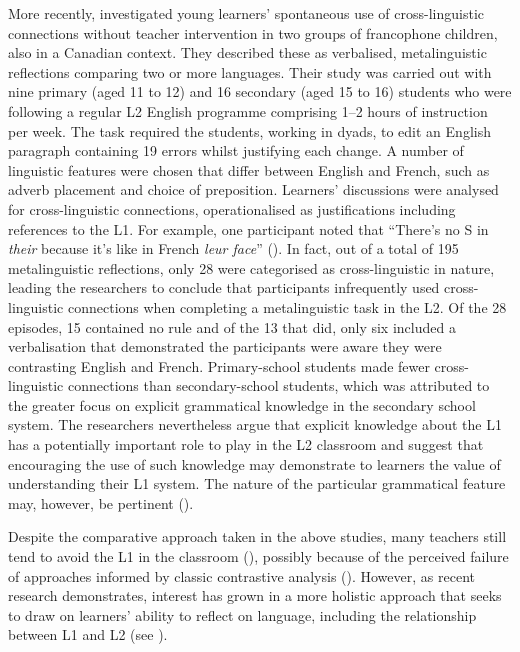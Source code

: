\documentclass[output=paper]{langscibook}
\begin{document}
More recently, \citet{BellEtAl2020} investigated young learners’ spontaneous use of cross-linguistic connections without teacher intervention in two groups of francophone children, also in a Canadian context. They described these as verbalised, metalinguistic reflections comparing two or more languages. Their study was carried out with nine primary (aged 11 to 12) and 16 secondary (aged 15 to 16) students who were following a regular L2 English programme comprising 1--2 hours of instruction per week. The task required the students, working in dyads, to edit an English paragraph containing 19 errors whilst justifying each change. A number of linguistic features were chosen that differ between English and French, such as adverb placement and choice of preposition. Learners’ discussions were analysed for cross-linguistic connections, operationalised as justifications including references to the L1. For example, one participant noted that ``There's no S in \textit{their} because it’s like in French \textit{leur face}'' (\citealt[103]{BellEtAl2020}). In fact, out of a total of 195 metalinguistic reflections, only 28 were categorised as cross-linguistic in nature, leading the researchers to conclude that participants infrequently used cross-linguistic connections when completing a metalinguistic task in the L2. Of the 28 episodes, 15 contained no rule and of the 13 that did, only six included a verbalisation that demonstrated the participants were aware they were contrasting English and French. Primary-school students made fewer cross-linguistic connections than secondary-school students, which was attributed to the greater focus on explicit grammatical knowledge in the secondary school system. The researchers nevertheless argue that explicit knowledge about the L1 has a potentially important role to play in the L2 classroom and suggest that encouraging the use of such knowledge may demonstrate to learners the value of understanding their L1 system. The nature of the particular grammatical feature may, however, be pertinent (\citealt{McManus2019}).

Despite the comparative approach taken in the above studies, many teachers still tend to avoid the L1 in the classroom (\citealt{HorstEtAl2010}), possibly because of the perceived failure of approaches informed by classic contrastive analysis (\citealt{BellEtAl2020}). However, as recent research demonstrates, interest has grown in a more holistic approach that seeks to draw on learners’ ability to reflect on language, including the relationship between L1 and L2 (see \citealt{HallCook2012}).
\end{document}
